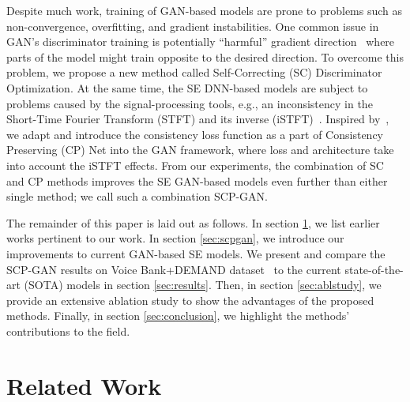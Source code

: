 \documentclass{article}
\begin{document}
Despite much work, training of GAN-based models are prone to problems such as non-convergence, overfitting, and gradient instabilities. One  common issue in GAN's discriminator training is potentially ``harmful'' gradient direction~\cite{Zadorozhnyy_2021_CVPR} where parts of the model might train opposite to the desired direction. To overcome this problem, we propose a new method called Self-Correcting (SC) Discriminator Optimization. At the same time, the SE DNN-based models are subject to problems caused by the signal-processing tools, e.g., an inconsistency in the Short-Time Fourier Transform (STFT) and its inverse (iSTFT)~\cite{Wisdom2019DifferentiableCC,le2010fast}. Inspired by~\cite{Braun2021TowardsEM}, we adapt and introduce the consistency loss function as a part of Consistency Preserving (CP) Net into the GAN framework, where loss and architecture take into account the iSTFT effects. From our experiments, the combination of SC and CP methods improves the SE GAN-based models even further than either single method; we call such a combination SCP-GAN.




The remainder of this paper is laid out as follows. In section \ref{sec:relatedwork}, we list earlier works pertinent to our work. In section \ref{sec:scpgan}, we introduce our improvements to current GAN-based SE models. We present and compare the SCP-GAN results on Voice Bank+DEMAND dataset~\cite{ValentiniBotinhao2016InvestigatingRS} to the current state-of-the-art (SOTA) models in section \ref{sec:results}. Then, in section \ref{sec:ablstudy}, we provide an extensive ablation study to show the advantages of the proposed methods. Finally, in section \ref{sec:conclusion}, we highlight the methods' contributions to the field.

\section{Related Work}\label{sec:relatedwork}
\end{document}
